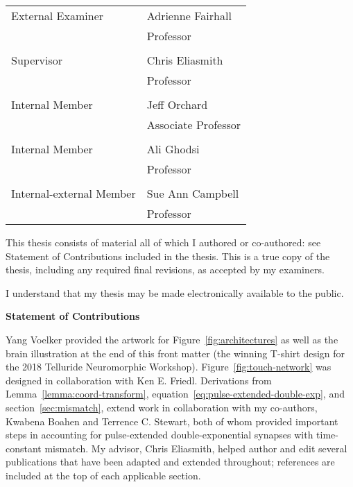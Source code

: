 \noindent\begin{tabular}{@{}ll}\\
    External Examiner & Adrienne Fairhall \\ & Professor \\ \\
    Supervisor & Chris Eliasmith \\ & Professor \\ \\
    Internal Member & Jeff Orchard \\ & Associate Professor \\ \\
    Internal Member & Ali Ghodsi \\ & Professor \\ \\
    Internal-external Member & Sue Ann Campbell \\ & Professor
\end{tabular}

\cleardoublepage

\noindent
This thesis consists of material all of which I authored or co-authored: see Statement of Contributions included in the thesis. This is a true copy of the thesis, including any required final revisions, as accepted by my examiners.

\bigskip

\noindent
I understand that my thesis may be made electronically available to
the public.

\cleardoublepage

\begin{center}\textbf{Statement of Contributions}\end{center}

\noindent
Yang Voelker provided the artwork for Figure~\ref{fig:architectures} as well as the brain illustration at the end of this front matter (the winning T-shirt design for the 2018 Telluride Neuromorphic Workshop).
Figure~\ref{fig:touch-network} was designed in collaboration with Ken E. Friedl.
Derivations from Lemma~\ref{lemma:coord-transform}, equation~\ref{eq:pulse-extended-double-exp}, and section~\ref{sec:mismatch}, extend work in collaboration with my co-authors, Kwabena Boahen and Terrence C. Stewart, both of whom provided important steps in accounting for pulse-extended double-exponential synapses with time-constant mismatch.
My advisor, Chris Eliasmith, helped author and edit several publications that have been adapted and extended throughout; references are included at the top of each applicable section.

\cleardoublepage
